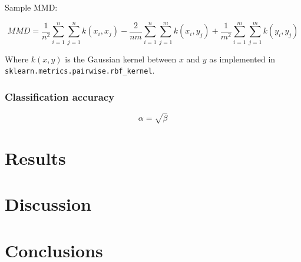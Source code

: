 \documentclass[titlepage]{article}
\begin{document}
Sample MMD:

\begin{equation}
	\label{mmd}
	MMD = \frac{1}{n^2}\sum_{i=1}^n{\sum_{j=1}^n{k(x_i, x_j)}} - \frac{2}{nm}\sum_{i=1}^n{\sum_{j=1}^m{k(x_i, y_j)}} + \frac{1}{m^2}\sum_{i=1}^m{\sum_{j=1}^m{k(y_i, y_j)}}
\end{equation}

Where $k(x, y)$ is the Gaussian kernel between $x$ and $y$ as implemented in \texttt{sklearn.metrics.pairwise.rbf\_kernel}.

\subsubsection{Classification accuracy}

\begin{equation}
	\label{simple_equation}
	\alpha = \sqrt{ \beta }
\end{equation}

\section{Results}

\section{Discussion}

\section{Conclusions}


\end{document}
